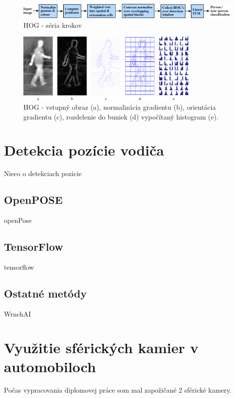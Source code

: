 \documentclass[slovak,master,dept460,male,cpp,cpdeclaration]{diploma}
\begin{document}
\begin{figure}[ht]
	\centering
	\includegraphics[width=1\textwidth]{Figures/hog.png}
	\caption{HOG - séria krokov \cite{dalal2005}}
	\label{fig:HOG1}
\end{figure}

\begin{figure}[ht]
	\centering
	\includegraphics[width=0.8\textwidth]{Figures/hog3.png}
	\caption{HOG - vstupný obraz (a), normalizácia gradientu (b), orientácia gradientu (c), rozdelenie do buniek (d) vypočítaný histogram (e). \cite{bertozzi2007pedestrian}}
	\label{fig:HOG2}
\end{figure}


\newpage
\section{Detekcia pozície vodiča}
\label{sec:Pose detection}
Nieco  o detekciach pozicie


\newpage
\subsection{OpenPOSE}
openPose


\newpage
\subsection{TensorFlow}
tensorflow


\newpage
\subsection{Ostatné metódy}
WrnchAI





\newpage
\section{Využitie sférických kamier v automobiloch}
\label{sec:Spherical cameras}
Počas vypracovania diplomovej práce som mal zapožičané 2 sférické kamery. 
\end{document}
